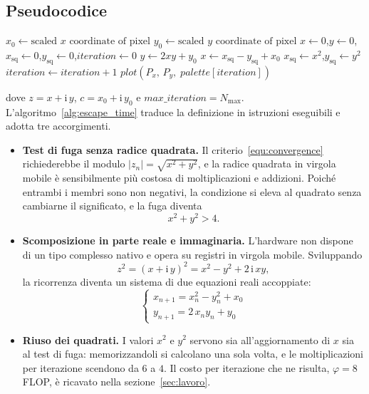 \subsection{Pseudocodice} \label{pseudo}
\vspace{3mm}
\begin{pseudocode}
\label{alg:escape_time}
\begin{algorithmic}[1]
    \State $x_0 \gets \text{scaled } x \text{ coordinate of pixel}$
    \State $y_0 \gets \text{scaled } y \text{ coordinate of pixel}$
    \State $x \gets 0$,\quad $y \gets 0$,\quad $x_{\mathrm{sq}} \gets 0$,\quad $y_{\mathrm{sq}} \gets 0$,\quad $iteration \gets 0$
        \State $y \gets 2xy + y_0$
        \State $x \gets x_{\mathrm{sq}} - y_{\mathrm{sq}} + x_0$
        \State $x_{\mathrm{sq}} \gets x^2$,\quad $y_{\mathrm{sq}} \gets y^2$
        \State $iteration \gets iteration + 1$
    \EndWhile
    \State $\mathit{plot}(P_x,\, P_y,\; \mathit{palette}[iteration])$
\EndFor
\end{algorithmic}
\end{pseudocode}
\noindent dove $z = x + \mathrm{i}\,y$, $c = x_0 + \mathrm{i}\,y_0$ e
$\mathit{max\_iteration} = N_{\max}$. L'algoritmo~\ref{alg:escape_time} traduce la
definizione in istruzioni eseguibili e adotta tre accorgimenti.

\begin{itemize}
    \item \textbf{Test di fuga senza radice quadrata.} Il
    criterio~\eqref{equ:convergence} richiederebbe il modulo
    $|z_n| = \sqrt{x^2 + y^2}$, e la radice quadrata in virgola mobile è
    sensibilmente più costosa di moltiplicazioni e addizioni. Poiché entrambi i
    membri sono non negativi, la condizione si eleva al quadrato senza cambiarne il
    significato, e la fuga diventa
    \[
    x^2 + y^2 > 4.
    \]

    \item \textbf{Scomposizione in parte reale e immaginaria.} L'hardware non
    dispone di un tipo complesso nativo e opera su registri in virgola mobile.
    Sviluppando
    \[
    z^2 = (x + \mathrm{i}\,y)^2 = x^2 - y^2 + 2\,\mathrm{i}\,xy,
    \]
    la ricorrenza diventa un sistema di due equazioni reali accoppiate:
    \[
    \begin{cases}
        x_{n+1} = x_n^2 - y_n^2 + x_0\\
        y_{n+1} = 2\,x_n y_n + y_0
    \end{cases}
    \]

    \item \textbf{Riuso dei quadrati.} I valori $x^2$ e $y^2$ servono sia
    all'aggiornamento di $x$ sia al test di fuga: memorizzandoli si calcolano una
    sola volta, e le moltiplicazioni per iterazione scendono da $6$ a $4$. Il costo
    per iterazione che ne risulta, $\varphi = 8$ FLOP, è ricavato nella
    sezione~\ref{sec:lavoro}.
\end{itemize}

